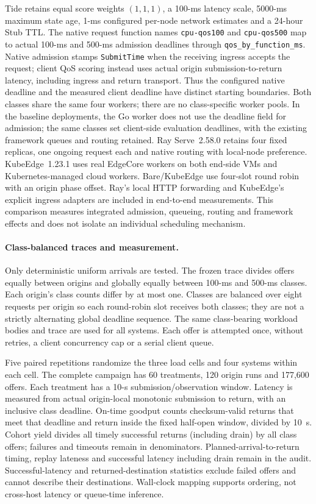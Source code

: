 Tide retains equal score weights $(1,1,1)$, a 100-ms latency scale, 5000-ms maximum state age, 1-ms configured per-node network estimates and a 24-hour Stub TTL. The native request function names \texttt{cpu-qos100} and \texttt{cpu-qos500} map to actual 100-ms and 500-ms admission deadlines through \texttt{qos\_by\_function\_ms}. Native admission stamps \texttt{SubmitTime} when the receiving ingress accepts the request; client QoS scoring instead uses actual origin submission-to-return latency, including ingress and return transport. Thus the configured native deadline and the measured client deadline have distinct starting boundaries. Both classes share the same four workers; there are no class-specific worker pools. In the baseline deployments, the Go worker does not use the deadline field for admission; the same classes set client-side evaluation deadlines, with the existing framework queues and routing retained. Ray Serve~2.58.0 retains four fixed replicas, one ongoing request each and native routing with local-node preference. KubeEdge~1.23.1 uses real EdgeCore workers on both end-side VMs and Kubernetes-managed cloud workers. Bare/KubeEdge use four-slot round robin with an origin phase offset. Ray's local HTTP forwarding and KubeEdge's explicit ingress adapters are included in end-to-end measurements. This comparison measures integrated admission, queueing, routing and framework effects and does not isolate an individual scheduling mechanism.

\paragraph{Class-balanced traces and measurement.}
Only deterministic uniform arrivals are tested. The frozen trace divides offers equally between origins and globally equally between 100-ms and 500-ms classes. Each origin's class counts differ by at most one. Classes are balanced over eight requests per origin so each round-robin slot receives both classes; they are not a strictly alternating global deadline sequence. The same class-bearing workload bodies and trace are used for all systems. Each offer is attempted once, without retries, a client concurrency cap or a serial client queue.

Five paired repetitions randomize the three load cells and four systems within each cell. The complete campaign has 60 treatments, 120 origin runs and 177,600 offers. Each treatment has a 10-s submission/observation window. Latency is measured from actual origin-local monotonic submission to return, with an inclusive class deadline. On-time goodput counts checksum-valid returns that meet that deadline and return inside the fixed half-open window, divided by 10~s. Cohort yield divides all timely successful returns (including drain) by all class offers; failures and timeouts remain in denominators. Planned-arrival-to-return timing, replay lateness and successful latency including drain remain in the audit. Successful-latency and returned-destination statistics exclude failed offers and cannot describe their destinations. Wall-clock mapping supports ordering, not cross-host latency or queue-time inference.

